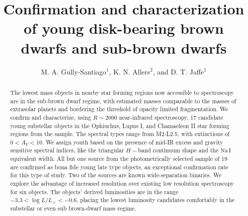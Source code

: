 \documentclass[11pt,twoside]{article}
\begin{document}
\title{Confirmation and characterization of young disk-bearing brown dwarfs and sub-brown dwarfs}
\author{M. A. Gully-Santiago$^1$, K. N. Allers$^2$, and D. T. Jaffe$^1$
}

\begin{abstract}
The lowest mass objects in nearby star forming regions now accessible to spectroscopy are in the sub-brown dwarf regime, with estimated masses comparable to the masses of extrasolar planets and bordering the threshold of opacity limited fragmentation.  We confirm and characterize, using $R\sim 2000$ near-infrared spectroscopy, 17 candidate young substellar objects in the Ophiuchus, Lupus I, and Chamaeleon II star forming regions from the \citet{allers06} sample.  The spectral types range from M2-L2.5, with extinctions of $0 < A_V < 10$.  We assign youth based on the presence of mid-IR excess and gravity sensitive spectral indices, like the triangular $H-$band continuum shape and the $\mathrm{Na\, I}$ equivalent width.  All but one source from the photometrically selected sample of 19 are confirmed as bona fide young late type objects, an exceptional confirmation rate for this type of study.  Two of the sources are known wide-separation binaries.  We explore the advantage of increased resolution over existing low resolution spectroscopy for six objects.  The objects' derived luminosities are in the range $-3.3 < \log L/L_{\sun} < -0.6$, placing the lowest luminosity candidates comfortably in the substellar or even sub brown-dwarf mass regime.
\end{abstract}
\end{document}
